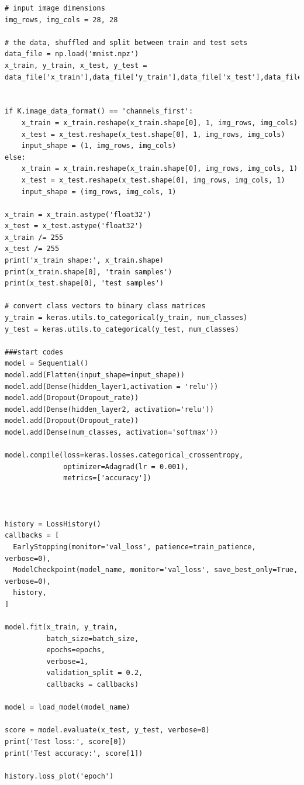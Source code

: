 \documentclass{article}
\begin{document}
\begin{lstlisting}
# input image dimensions
img_rows, img_cols = 28, 28

# the data, shuffled and split between train and test sets
data_file = np.load('mnist.npz')
x_train, y_train, x_test, y_test = data_file['x_train'],data_file['y_train'],data_file['x_test'],data_file['y_test']


if K.image_data_format() == 'channels_first':
    x_train = x_train.reshape(x_train.shape[0], 1, img_rows, img_cols)
    x_test = x_test.reshape(x_test.shape[0], 1, img_rows, img_cols)
    input_shape = (1, img_rows, img_cols)
else:
    x_train = x_train.reshape(x_train.shape[0], img_rows, img_cols, 1)
    x_test = x_test.reshape(x_test.shape[0], img_rows, img_cols, 1)
    input_shape = (img_rows, img_cols, 1)

x_train = x_train.astype('float32')
x_test = x_test.astype('float32')
x_train /= 255
x_test /= 255
print('x_train shape:', x_train.shape)
print(x_train.shape[0], 'train samples')
print(x_test.shape[0], 'test samples')

# convert class vectors to binary class matrices
y_train = keras.utils.to_categorical(y_train, num_classes)
y_test = keras.utils.to_categorical(y_test, num_classes)

###start codes
model = Sequential()
model.add(Flatten(input_shape=input_shape))
model.add(Dense(hidden_layer1,activation = 'relu'))
model.add(Dropout(Dropout_rate))
model.add(Dense(hidden_layer2, activation='relu'))
model.add(Dropout(Dropout_rate))
model.add(Dense(num_classes, activation='softmax'))

model.compile(loss=keras.losses.categorical_crossentropy,
              optimizer=Adagrad(lr = 0.001),
              metrics=['accuracy'])



history = LossHistory()
callbacks = [
  EarlyStopping(monitor='val_loss', patience=train_patience, verbose=0),
  ModelCheckpoint(model_name, monitor='val_loss', save_best_only=True, verbose=0),
  history,
]

model.fit(x_train, y_train,
          batch_size=batch_size,
          epochs=epochs,
          verbose=1,
          validation_split = 0.2,
          callbacks = callbacks)

model = load_model(model_name)

score = model.evaluate(x_test, y_test, verbose=0)
print('Test loss:', score[0])
print('Test accuracy:', score[1])

history.loss_plot('epoch')

\end{lstlisting}
\end{document}
